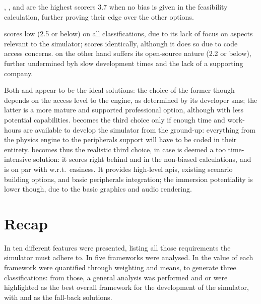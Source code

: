 , , and  are the highest scorers \num{3,7} when no bias is given in the \gls{feasibility} calculation, further proving their edge over the other options.

 scores low (\num{2,5} or below) on all classifications, due to its lack of focus on aspects relevant to the simulator;  scores identically, although it does so due to code access concerns.  on the other hand suffers its open-source nature (\num{2,2} or below), further undermined byh slow development times and the lack of a supporting company.

Both  and  appear to be the ideal solutions: the choice of the former though depends on the access level to the engine, as determined by its developer \gls{sms}; the latter is a more mature and supported professional option, although with less potential capabilities.  becomes the third choice only if enough time and work-hours are available to develop the simulator from the ground-up: everything from the physics engine to the peripherals support will have to be coded in their entirety.  becomes thus the realistic third choice, in case  is deemed a too time-intensive solution: it scores right behind  and  in the non-biased calculations, and is on par with  w.r.t.\ \gls{easiness}. It provides high-level \glspl{api}, existing scenario building options, and basic peripherals integration; the immersion potentiality is lower though, due to the basic graphics and audio rendering.

\section{Recap}\label{sc:stateoftheart:recap}

In  ten different \glspl{feature} were presented, listing all those requirements the simulator must adhere to. In  five \glspl{framework} were analysed. In  the value of each \gls{framework} were quantified through weighting and means, to generate three classifications: from those, a general analysis was performed and  or  were highlighted as the best overall \gls{framework} for the development of the simulator, with  and  as the fall-back solutions.
